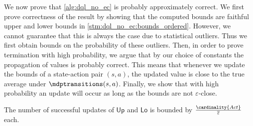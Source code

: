 \documentclass{article}
\newcommand{\Actions}{Act}
\newcommand{\upperbound}{\mathsf{Up}}
\newcommand{\lowerbound}{\mathsf{Lo}}
\newcommand{\updatestep}{{\overline{\varepsilon}}}
\begin{document}
We now prove that \cref{alg:dql_no_ec} is probably approximately correct.
We first prove correctness of the result by showing that the computed bounds are faithful upper and lower bounds in \cref{stm:dql_no_ec:bounds_ordered}.
However, we cannot guarantee that this is always the case due to statistical outliers.
Thus we first obtain bounds on the probability of these outliers.
Then, in order to prove termination with high probability, we argue that by our choice of constants the propagation of values is probably correct.
This means that whenever we update the bounds of a state-action pair $(s, a)$, the updated value is close to the true average under $\mdptransitions(s, a)$.
Finally, we show that with high probability an update will occur as long as the bounds are not $\varepsilon$-close.


\begin{lemma} \label{stm:dql_no_ec:successful_update_count}
	The number of successful updates of $\upperbound$ and $\lowerbound$ is bounded by $\frac{\cardinality{\Actions}}{\updatestep}$ each.
\end{lemma}
\end{document}
